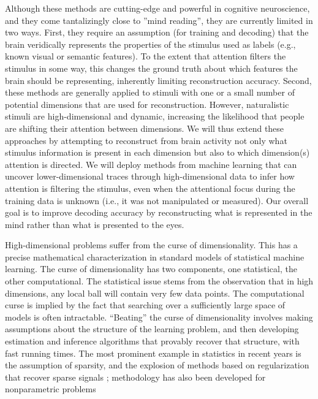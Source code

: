 Although these methods are cutting-edge and powerful in cognitive
neuroscience, and they come tantalizingly close to ''mind reading'',
they are currently limited in two ways. First, they require an
assumption (for training and decoding) that the brain veridically
represents the properties of the stimulus used as labels (e.g., known
visual or semantic features). To the extent that attention filters the
stimulus in some way, this changes the ground truth about which
features the brain should be representing, inherently limiting
reconstruction accuracy. Second, these methods are generally applied
to stimuli with one or a small number of potential dimensions that are
used for reconstruction. However, naturalistic stimuli are
high-dimensional and dynamic, increasing the likelihood that people
are shifting their attention between dimensions. We will thus extend
these approaches by attempting to reconstruct from brain activity not
only what stimulus information is present in each dimension but also
to which dimension(s) attention is directed. We will deploy methods
from machine learning that can uncover lower-dimensional traces
through high-dimensional data to infer how attention is filtering the
stimulus, even when the attentional focus during the training data is
unknown (i.e., it was not manipulated or measured). Our
overall goal is to improve decoding accuracy by reconstructing what is
represented in the mind rather than what is presented to the eyes.


\statbackground{} High-dimensional problems suffer from the curse of
dimensionality. This has a precise mathematical characterization in
standard models of statistical machine learning. The curse of
dimensionality has two components, one statistical, the other
computational. The statistical issue stems from the observation that
in high dimensions, any local ball will contain very few data
points. The computational curse is implied by the fact that searching
over a sufficiently large space of models is often
intractable. ``Beating'' the curse of dimensionality involves making
assumptions about the structure of the learning problem, and then
developing estimation and inference algorithms that provably 
recover that structure, with fast running times. The most prominent 
example in statistics in recent years is the assumption of sparsity, and the explosion of methods based on regularization that recover sparse signals \citep{Tibs:1996,lars,Wain:09a,wasserman:09,Zou:Hastie:Tibs:05,FHT:07}; methodology has also been developed for nonparametric problems \citep{LZ:Cosso,Ravikumar:08,lafferty2008rodeo,NPN:09,skeptic,NRRR:NIPS}

